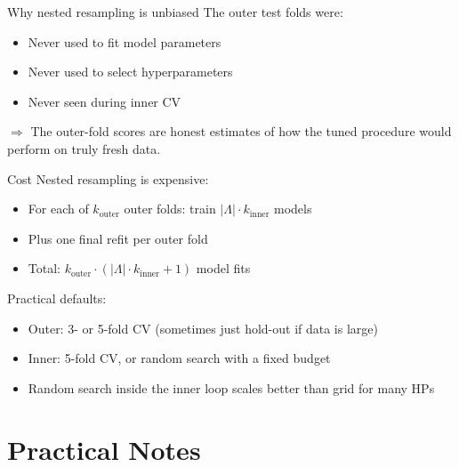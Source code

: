 \documentclass[aspectratio=169]{beamer}
\begin{document}
\begin{frame}{Why nested resampling is unbiased}
  The outer test folds were:
  \begin{itemize}
    \item Never used to fit model parameters
    \item Never used to select hyperparameters
    \item Never seen during inner CV
  \end{itemize}
  \vfill
  $\Rightarrow$ The outer-fold scores are honest estimates of how the tuned procedure would perform on truly fresh data.
\end{frame}

\begin{frame}{Cost}
  Nested resampling is expensive:
  \begin{itemize}
    \item For each of $k_{\text{outer}}$ outer folds: train $|\Lambda| \cdot k_{\text{inner}}$ models
    \item Plus one final refit per outer fold
    \item Total: $k_{\text{outer}} \cdot (|\Lambda| \cdot k_{\text{inner}} + 1)$ model fits
  \end{itemize}
  \vfill
  Practical defaults:
  \begin{itemize}
    \item Outer: 3- or 5-fold CV (sometimes just hold-out if data is large)
    \item Inner: 5-fold CV, or random search with a fixed budget
    \item Random search inside the inner loop scales better than grid for many HPs
  \end{itemize}
\end{frame}

\section{Practical Notes}
\end{document}
